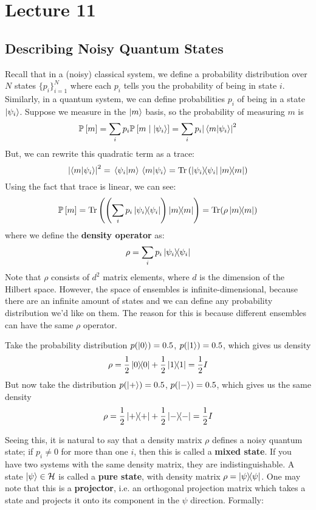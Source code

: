 \section{Lecture 11}

\subsection{Describing Noisy Quantum States}
Recall that in a (noisy) classical system, we define a probability distribution over $N$ states
$\{p_i\}_{i = 1}^N$ where each $p_i$ tells you the probability of being in state $i$. Similarly, in a quantum system,
we can define probabilities $p_i$ of being in a state $\ket{\psi_i}$. Suppose we measure in the $\ket{m}$
basis, so the probability of measuring $m$ is
\[ \mathbb{P}\left[ m \right] = \sum_i p_i \mathbb{P}\left[ m \mid \ket{\psi_i} \right] = \sum_i p_i \qty|\braket*{m}{\psi_i}|^2 \]
But, we can rewrite this quadratic term as a trace:
\[ \abs{\braket{m}{\psi_i}}^2 = \braket*{\psi_i}{m}\braket*{m}{\psi_i} = \Tr\left(\ketbra{\psi_i}{\psi_i}\ketbra{m}{m} \right) \]
Using the fact that trace is linear, we can see:
\[ \mathbb{P}\left[ m \right] = \Tr\qty(\qty(\sum_i p_i \ketbra{\psi_i}{\psi_i}) \ketbra{m}{m}) = \Tr(\rho \ketbra{m}{m})\]
where we define the \textbf{density operator} as:
\[ \rho = \sum_i p_i \ketbra{\psi_i}{\psi_i} \]
Note that $\rho$ consists of $d^2$ matrix elements, where $d$ is the dimension of the Hilbert space.
However, the space of ensembles is infinite-dimensional, because there are an infinite amount of states
and we can define any probability distribution we'd like on them.
The reason for this is because different ensembles can have the same $\rho$ operator.

\begin{example}
    Take the probability distribution $p(\ket{0}) = 0.5$, $p(\ket{1}) = 0.5$, which gives us density
    \[ \rho = \frac{1}{2} \ketbra{0}{0} + \frac{1}{2} \ketbra{1}{1} = \frac{1}{2} I \]
    But now take the distribution $p(\ket{+}) = 0.5$, $p(\ket{-}) = 0.5$, which gives us the same density
    \[ \rho = \frac{1}{2} \ketbra{+}{+} + \frac{1}{2} \ketbra{-}{-} = \frac{1}{2} I \]
\end{example}

Seeing this, it is natural to say that a density matrix $\rho$ defines a noisy quantum state; if $p_i \neq 0$ for more than one $i$, then
this is
called a \textbf{mixed state}. If you have two systems
with the same density matrix, they are indistinguishable. A state $\ket{\psi} \in \mathcal{H}$ is called a \textbf{pure state}, with density matrix $\rho = \ketbra{\psi}{\psi}$. One may note that this is a \textbf{projector}, i.e. an orthogonal projection matrix which takes a state and projects it onto its component in the $\psi$ direction. Formally:

